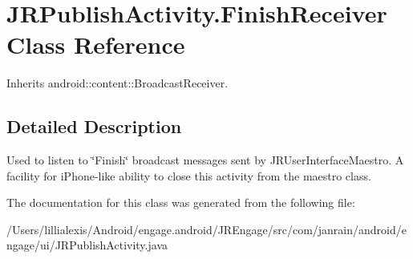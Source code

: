 \hypertarget{classcom_1_1janrain_1_1android_1_1engage_1_1ui_1_1_j_r_publish_activity_1_1_finish_receiver}{
\section{JRPublishActivity.FinishReceiver Class Reference}
\label{classcom_1_1janrain_1_1android_1_1engage_1_1ui_1_1_j_r_publish_activity_1_1_finish_receiver}
}


Inherits android::content::BroadcastReceiver.



\subsection{Detailed Description}
Used to listen to \char`\"{}Finish\char`\"{} broadcast messages sent by JRUserInterfaceMaestro. A facility for iPhone-\/like ability to close this activity from the maestro class. 

The documentation for this class was generated from the following file:\begin{DoxyCompactItemize}
\item 
/Users/lillialexis/Android/engage.android/JREngage/src/com/janrain/android/engage/ui/JRPublishActivity.java\end{DoxyCompactItemize}
